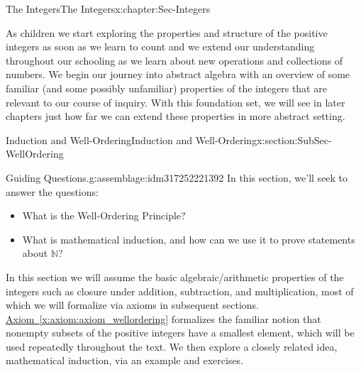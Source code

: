 \documentclass[oneside,10pt,]{book}
\newcommand{\xreffont}{\relax}
\numberwithin{equation}{section}
\def\N{{\mathbb N}}
\begin{document}
\renewcommand*\contentsname{Contents}
\tableofcontents
\mainmatter
%
%
\typeout{************************************************}
\typeout{************************************************}
%
\begin{chapterptx}{The Integers}{}{The Integers}{}{}{x:chapter:Sec-Integers}
\begin{introduction}{}%
As children we start exploring the properties and structure of the positive integers as soon as we learn to count and we extend our understanding throughout our schooling as we learn about new operations and collections of numbers. We begin our journey into abstract algebra with an overview of some familiar (and some possibly unfamiliar) properties of the integers that are relevant to our course of inquiry. With this foundation set, we will see in later chapters just how far we can extend these properties in more abstract setting.%
\end{introduction}%
%
%
\typeout{************************************************}
\typeout{************************************************}
%
\begin{sectionptx}{Induction and Well-Ordering}{}{Induction and Well-Ordering}{}{}{x:section:SubSec-WellOrdering}
\begin{assemblage}{Guiding Questions.}{g:assemblage:idm317252221392}%
In this section, we'll seek to answer the questions: %
\begin{itemize}[label=\textbullet]
\item{}What is the Well-Ordering Principle?%
\item{}What is mathematical induction, and how can we use it to prove statements about \(\N\)?%
\end{itemize}
%
\end{assemblage}
\begin{introduction}{}%
In this section we will assume the basic algebraic\slash{}arithmetic properties of the integers such as closure under addition, subtraction, and multiplication, most of which we will formalize via axioms in subsequent sections. \hyperref[x:axiom:axiom_wellordering]{Axiom~{\xreffont\ref{x:axiom:axiom_wellordering}}} formalizes the familiar notion that nonempty subsets of the positive integers have a smallest element, which will be used repeatedly throughout the text. We then explore a closely related idea, mathematical induction, via an example and exercises.%
\end{introduction}%

\end{sectionptx}
\end{chapterptx}
\end{document}
